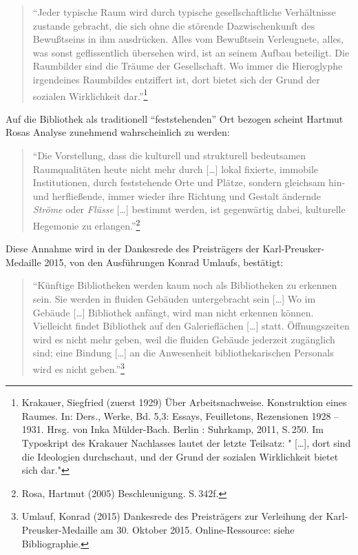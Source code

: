 \documentclass[a4paper,
fontsize=11pt,
oneside,
numbers=noperiodatend,
parskip=half-,
bibliography=totoc,
final
]{scrartcl}
\begin{document}
\begin{quote}
\enquote{Jeder typische Raum wird durch typische gesellschaftliche
Verhältnisse zustande gebracht, die sich ohne die störende
Dazwischenkunft des Bewußtseins in ihm ausdrücken. Alles vom Bewußtsein
Verleugnete, alles, was sonst geflissentlich übersehen wird, ist an
seinem Aufbau beteiligt. Die Raumbilder sind die Träume der
Gesellschaft. Wo immer die Hieroglyphe irgendeines Raumbildes entziffert
ist, dort bietet sich der Grund der sozialen Wirklichkeit
dar.}\footnote{Krakauer, Siegfried (zuerst 1929) Über Arbeitsnachweise.
  Konstruktion eines Raumes. In: Ders., Werke, Bd. 5,3: Essays,
  Feuilletons, Rezensionen 1928 -- 1931. Hrsg. von Inka Mülder-Bach.
  Berlin : Suhrkamp, 2011, S.\,250. Im Typoskript des Krakauer Nachlasses
  lautet der letzte Teilsatz: " {[}\ldots{}{]}, dort sind die Ideologien
  durchschaut, und der Grund der sozialen Wirklichkeit bietet sich dar."}
\end{quote}

Auf die Bibliothek als traditionell \enquote{feststehenden} Ort bezogen
scheint Hartmut Rosas Analyse zunehmend wahrscheinlich zu werden:

\begin{quote}
\enquote{Die Vorstellung, dass die kulturell und strukturell bedeutsamen
Raumqualitäten heute nicht mehr durch {[}\ldots{}{]} lokal fixierte,
immobile Institutionen, durch feststehende Orte und Plätze, sondern
gleichsam hin- und herfließende, immer wieder ihre Richtung und Gestalt
ändernde \emph{Ströme} oder \emph{Flüsse} {[}\ldots{}{]} bestimmt
werden, ist gegenwärtig dabei, kulturelle Hegemonie zu
erlangen.}\footnote{Rosa, Hartmut (2005) Beschleunigung. S.\,342f.}
\end{quote}

Diese Annahme wird in der Dankesrede des Preisträgers der
Karl-Preusker-Medaille 2015, von den Ausführungen Konrad Umlaufs,
bestätigt:

\begin{quote}
\enquote{Künftige Bibliotheken werden kaum noch als Bibliotheken zu
erkennen sein. Sie werden in fluiden Gebäuden untergebracht sein
{[}\ldots{}{]} Wo im Gebäude {[}\ldots{}{]} Bibliothek anfängt, wird man
nicht erkennen können. Vielleicht findet Bibliothek auf den
Galerieflächen {[}\ldots{}{]} statt. Öffnungszeiten wird es nicht mehr
geben, weil die fluiden Gebäude jederzeit zugänglich sind; eine Bindung
{[}\ldots{}{]} an die Anwesenheit bibliothekarischen Personals wird es
nicht geben.}\footnote{Umlauf, Konrad (2015) Dankesrede des Preisträgers
  zur Verleihung der Karl-Preusker-Medaille am 30. Oktober 2015.
  Online-Ressource: siehe Bibliographie.}
\end{quote}
\end{document}
